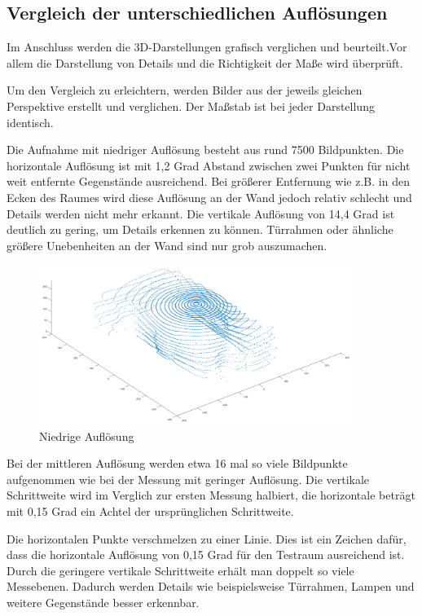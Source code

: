 \subsection{Vergleich der unterschiedlichen Auflösungen}

Im Anschluss werden die 3D-Darstellungen grafisch verglichen und beurteilt.Vor allem die Darstellung von Details und die Richtigkeit der Maße wird überprüft. 

Um den Vergleich zu erleichtern, werden Bilder aus der jeweils gleichen Perspektive erstellt und verglichen. Der Maßstab ist bei jeder Darstellung identisch.
 
Die Aufnahme mit niedriger Auflösung besteht aus rund 7500 Bildpunkten. Die horizontale Auflösung ist mit 1,2 Grad Abstand zwischen zwei Punkten für nicht weit entfernte Gegenstände ausreichend. Bei größerer Entfernung wie z.B. in den Ecken des Raumes wird diese Auflösung an der Wand jedoch relativ schlecht und Details werden nicht mehr erkannt.
Die vertikale Auflösung von 14,4 Grad ist deutlich zu gering, um Details erkennen zu können. Türrahmen oder ähnliche größere Unebenheiten an der Wand sind nur grob auszumachen.   

\begin{figure}[H]
	\centering
	\includegraphics[width=0.9\textwidth]{images/Validierung/Aufloesungen/niedrig.png}
	\caption{Niedrige Auflösung}
	\label{niedrig}
\end{figure}


Bei der mittleren Auflösung werden etwa 16 mal so viele Bildpunkte aufgenommen wie bei der Messung mit geringer Auflösung. Die vertikale Schrittweite wird im Verglich zur ersten Messung halbiert, die horizontale beträgt mit 0,15 Grad ein Achtel der ursprünglichen Schrittweite. 

Die horizontalen Punkte verschmelzen zu einer Linie. Dies ist ein Zeichen dafür, dass die horizontale Auflösung von 0,15 Grad für den Testraum ausreichend ist. Durch die geringere vertikale Schrittweite erhält man doppelt so viele Messebenen. Dadurch werden Details wie beispielsweise Türrahmen, Lampen und weitere Gegenstände besser erkennbar. 


